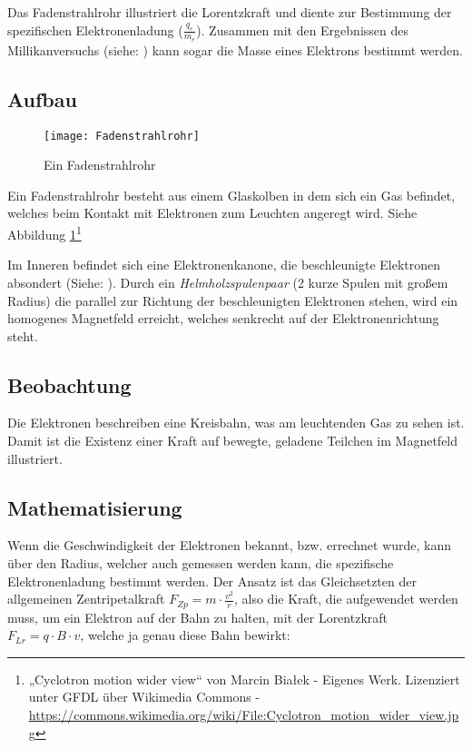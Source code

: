 Das Fadenstrahlrohr illustriert die Lorentzkraft und diente zur Bestimmung der spezifischen Elektronenladung ($\frac{q_e}{m_e}$). Zusammen mit den Ergebnissen des Millikanversuchs (siehe: ) kann sogar die Masse eines Elektrons bestimmt werden.

\subsection{Aufbau}

\begin{figure}[h!]
	\centering
	\texttt{[image: Fadenstrahlrohr]}
	\caption{Ein Fadenstrahlrohr}
	\label{fig:Fadenstrahlrohr}
\end{figure}

Ein Fadenstrahlrohr besteht aus einem Glaskolben in dem sich ein Gas befindet, welches beim Kontakt mit Elektronen zum Leuchten angeregt wird. Siehe Abbildung \ref{fig:Fadenstrahlrohr}\footnote{„Cyclotron motion wider view“ von Marcin Białek - Eigenes Werk. Lizenziert unter GFDL über Wikimedia Commons - \url{https://commons.wikimedia.org/wiki/File:Cyclotron\_motion\_wider\_view.jpg}}

Im Inneren befindet sich eine Elektronenkanone, die beschleunigte Elektronen absondert (Siehe: ). Durch ein \emph{Helmholzspulenpaar} (2 kurze Spulen mit großem Radius) die parallel zur Richtung der beschleunigten Elektronen stehen, wird ein homogenes Magnetfeld erreicht, welches senkrecht auf der Elektronenrichtung steht.

\subsection{Beobachtung}

Die Elektronen beschreiben eine Kreisbahn, was am leuchtenden Gas zu sehen ist. Damit ist die Existenz einer Kraft auf bewegte, geladene Teilchen im Magnetfeld illustriert.

\subsection{Mathematisierung}

Wenn die Geschwindigkeit der Elektronen bekannt, bzw. errechnet wurde, kann über den Radius, welcher auch gemessen werden kann, die spezifische Elektronenladung bestimmt werden. Der Ansatz ist das Gleichsetzten der allgemeinen Zentripetalkraft $F_{Zp} = m \cdot \frac{v^2}{r}$, also die Kraft, die aufgewendet werden muss, um ein Elektron auf der Bahn zu halten, mit der Lorentzkraft  $F_{Lr} = q \cdot B \cdot v$, welche ja genau diese Bahn bewirkt:

